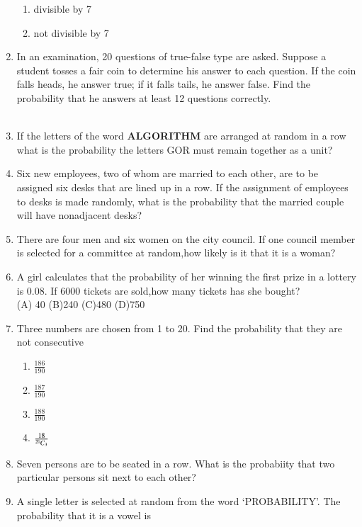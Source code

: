 \begin{enumerate}[label=\thesection.\arabic*,ref=\thesection.\theenumi]
\begin{enumerate}
 		\item divisible by 7
   		\item not divisible by 7
     	\end{enumerate}
\solution

\item In an examination, 20 questions of true-false type are asked. Suppose a student tosses a fair coin to determine his answer to each question. If the coin falls heads, he answer true; if it falls tails, he answer false. Find the probability that he answers at least 12 questions correctly.\\
\\
\solution

\item If the letters of the word \textbf{ALGORITHM} are arranged at random in a row what
is the probability the letters GOR must remain together as a unit?\\
\solution

\item Six new employees, two of whom are married to each other, are to be assigned six desks that
are lined up in a row. If the assignment of employees to desks is made randomly, what is the
probability that the married couple will have nonadjacent desks?\\
\solution

\item There are four men and six women on the city council.
If one council member is selected for a committee at random,how likely is it that it is a woman?\\
\solution

\item A girl calculates that the probability of her winning the first prize in a lottery is 0.08. If 6000 tickets are sold,how many tickets has she bought?\\
(A) 40  (B)240  (C)480  (D)750 

\item Three numbers are chosen from 1 to 20. Find the probability that they are not consecutive
\begin{enumerate}
	\item $\frac{186}{190}$\\
	\item $\frac{187}{190}$\\
	\item $\frac{188}{190}$\\
	\item $\frac{18}{{{}^{20}\mkern-1muC_{3}}}$ 
\end{enumerate}
\solution

\item Seven persons are to be seated in a row. What is the probabiity that two particular persons sit next to each other?\\
\solution

\item A single letter is selected at random from the word ‘PROBABILITY’. The
probability that it is a vowel is

    \end{enumerate}
